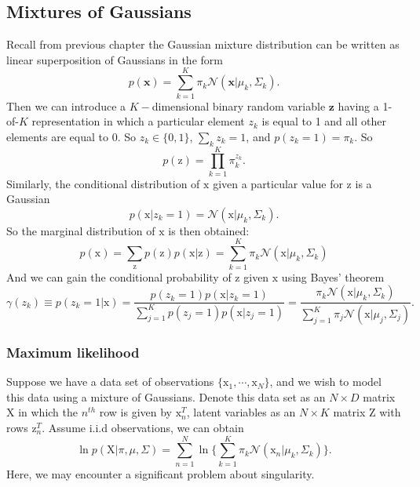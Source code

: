 \documentclass[a4paper]{book}
\newcommand{\normD}{\mathcal{N}}
\newcommand{\mrm}{\mathrm}
\newcommand{\mbf}{\mathbf}
\begin{document}
\subsection{Mixtures of Gaussians}
Recall from previous chapter the Gaussian mixture distribution can be written as linear superposition of Gaussians  in the form
\begin{equation}\label{}
  p(\mbf x) = \sum_{k=1}^{K}\pi_k\normD(\mbf x|\mu_k,\Sigma_k).
\end{equation}
Then we can introduce a $K-$dimensional binary random variable $\mbf z$ having a 1-of-$K$ representation in which a particular element $z_k$ is equal to 1 and all other elements are equal to 0. So $z_k \in \{0,1\}$, $\sum_{k}z_k=1$, and $p(z_k=1)=\pi_k$. So
\begin{equation}\label{}
  p(\mrm z) = \prod_{k=1}^{K}\pi_k^{z_k}.
\end{equation}
Similarly, the conditional distribution of $\mrm x$ given a particular value for $\mrm z$ is a Gaussian
\begin{equation}\label{}
  p(\mrm x|z_k=1) = \normD(\mrm x|\mu_k, \Sigma_k).
\end{equation}
So the marginal distribution of $\mrm x$ is then obtained:
\begin{equation}\label{}
  p(\mrm x) = \sum_{\mrm z}p(\mrm z)p(\mrm x|\mrm z) = \sum_{k=1}^{K}\pi_k\normD(\mrm x|\mu_k,\Sigma_k)
\end{equation}
And we can gain the conditional probability of $\mrm z$ given $\mrm x$ using Bayes' theorem
\begin{equation}\label{eq3.3.0}
  \gamma(z_k) \equiv p(z_k=1|\mrm x)=\frac{p(z_k=1)p(\mrm x|z_k=1)}{\sum_{j=1}^{K}p(z_j=1)p(\mrm x|z_j=1)} =  \frac{\pi_k\normD(\mrm x|\mu_k, \Sigma_k)}{\sum_{j=1}^{K}\pi_j\normD(\mrm x|\mu_j,\Sigma_j)}.
\end{equation}
\subsubsection*{Maximum likelihood}
Suppose we have a data set of observations $\{\mrm x_1, \cdots, \mrm x_N\}$, and we wish to model this data using a mixture of Gaussians. Denote this data set as an $N\times D$ matrix $\mrm X$ in which the $n^{th}$ row is given by $\mrm x_n^T$, latent variables as an $N\times K$ matrix $\mrm Z$ with rows $\mrm z_n^T$. Assume i.i.d observations, we can obtain
\begin{equation}\label{}
  \ln p(\mrm X|\pi, \mu, \Sigma) = \sum_{n=1}^{N}\ln\{\sum_{k=1}^{K}\pi_k\normD(\mrm x_n|\mu_k, \Sigma_k)\}.
\end{equation}
Here, we may encounter a significant problem about singularity.
\end{document}
